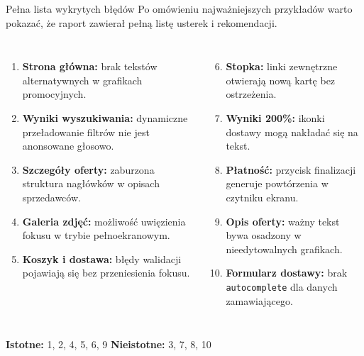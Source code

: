 \documentclass[aspectratio=169,11pt]{beamer}
\newcommand{\tagline}[1]{\textcolor{Slate}{\small #1}}
\begin{document}
\begin{frame}{Pełna lista wykrytych błędów}
  \tagline{Po omówieniu najważniejszych przykładów warto pokazać, że raport zawierał pełną listę usterek i rekomendacji.}

  \vspace{0.2cm}
  \scriptsize
  \begin{columns}[T,totalwidth=\textwidth]
      \begin{enumerate}
        \item \textbf{Strona główna:} brak tekstów alternatywnych w grafikach promocyjnych.
        \item \textbf{Wyniki wyszukiwania:} dynamiczne przeładowanie filtrów nie jest anonsowane głosowo.
        \item \textbf{Szczegóły oferty:} zaburzona struktura nagłówków w opisach sprzedawców.
        \item \textbf{Galeria zdjęć:} możliwość uwięzienia fokusu w trybie pełnoekranowym.
        \item \textbf{Koszyk i dostawa:} błędy walidacji pojawiają się bez przeniesienia fokusu.
      \end{enumerate}

      \begin{enumerate}
        \setcounter{enumi}{5}
        \item \textbf{Stopka:} linki zewnętrzne otwierają nową kartę bez ostrzeżenia.
        \item \textbf{Wyniki 200\%:} ikonki dostawy mogą nakładać się na tekst.
        \item \textbf{Płatność:} przycisk finalizacji generuje powtórzenia w czytniku ekranu.
        \item \textbf{Opis oferty:} ważny tekst bywa osadzony w nieedytowalnych grafikach.
        \item \textbf{Formularz dostawy:} brak \texttt{autocomplete} dla danych zamawiającego.
      \end{enumerate}
  \end{columns}

  \vspace{0.25cm}
  \small
  \textcolor{RiskRed}{\textbf{Istotne:}} 1, 2, 4, 5, 6, 9
  \hfill
  \textcolor{Slate}{\textbf{Nieistotne:}} 3, 7, 8, 10
\end{frame}
\end{document}
